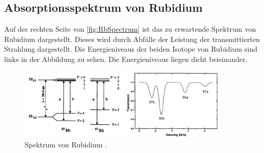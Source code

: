 \subsection{Absorptionsspektrum von Rubidium}
Auf der rechten Seite von \autoref{fig:RbSpectrum} ist das zu erwartende Spektrum von Rubidium dargestellt. Dieses wird durch Abfälle der Leistung
der transmittierten Strahlung dargestellt. Die Energieniveaus der beiden Isotope von Rubidium sind links in der Abbildung zu sehen. Die 
Energieniveaus liegen dicht beieinander.
\begin{figure}
    \centering
    \includegraphics[width=0.9\textwidth]{SpectrumIdeal.png}
    \caption{Spektrum von Rubidium \cite{ap60}.}
    \label{fig:RbSpectrum}
\end{figure}